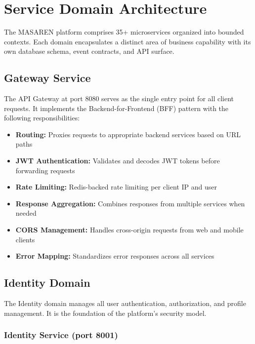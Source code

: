 \documentclass[11pt,a4paper]{article}
\begin{document}
\clearpage

\section{Service Domain Architecture}

The MASAREN platform comprises 35+ microservices organized into bounded contexts. Each domain encapsulates a distinct area of business capability with its own database schema, event contracts, and API surface.

\subsection{Gateway Service}

The API Gateway at port 8080 serves as the single entry point for all client requests. It implements the Backend-for-Frontend (BFF) pattern with the following responsibilities:

\begin{itemize}
  \item \textbf{Routing:} Proxies requests to appropriate backend services based on URL paths
  \item \textbf{JWT Authentication:} Validates and decodes JWT tokens before forwarding requests
  \item \textbf{Rate Limiting:} Redis-backed rate limiting per client IP and user
  \item \textbf{Response Aggregation:} Combines responses from multiple services when needed
  \item \textbf{CORS Management:} Handles cross-origin requests from web and mobile clients
  \item \textbf{Error Mapping:} Standardizes error responses across all services
\end{itemize}

\subsection{Identity Domain}

The Identity domain manages all user authentication, authorization, and profile management. It is the foundation of the platform's security model.

\subsubsection{Identity Service (port 8001)}
\end{document}
